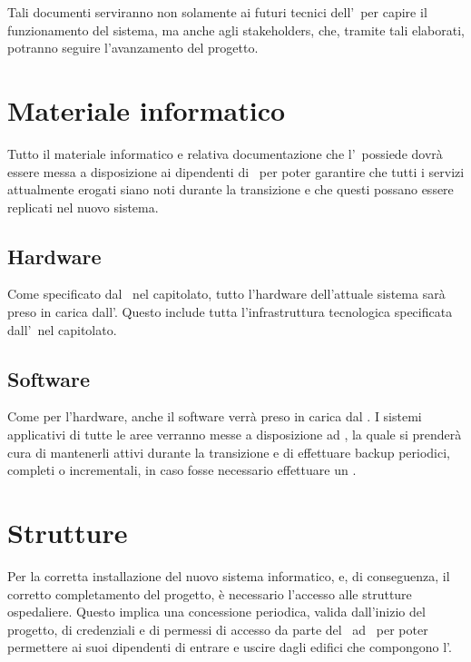 	Tali documenti serviranno non solamente ai futuri tecnici dell'\istituto~per capire il funzionamento del sistema, ma anche agli stakeholders, che, tramite tali elaborati, potranno seguire l'avanzamento del progetto.

\section{Materiale informatico}

	Tutto il materiale informatico e relativa documentazione che l'\istituto~possiede dovrà essere messa a disposizione ai dipendenti di \azienda~per poter garantire che tutti i servizi attualmente erogati siano noti durante la transizione e che questi possano essere replicati nel nuovo sistema.

	\subsection{Hardware}
		
		Come specificato dal \proponente~nel capitolato, tutto l'hardware dell'attuale sistema sarà preso in carica dall'\offerente.
		Questo include tutta l'infrastruttura tecnologica specificata dall'\istituto~nel capitolato.
		
	\subsection{Software}
	
		Come per l'hardware, anche il software verrà preso in carica dal \offerente.
		I sistemi applicativi di tutte le aree verranno messe a disposizione ad \azienda, la quale si prenderà cura di mantenerli attivi durante la transizione e di effettuare backup periodici, completi o incrementali, in caso fosse necessario effettuare un \rollback.
	
\section{Strutture}

	Per la corretta installazione del nuovo sistema informatico, e, di conseguenza, il corretto completamento del progetto, è necessario l'accesso alle strutture ospedaliere.
	Questo implica una concessione periodica, valida dall'inizio del progetto, di credenziali e di permessi di accesso da parte del \proponente~ad \azienda~per poter permettere ai suoi dipendenti di entrare e uscire dagli edifici che compongono l'\istituto.

